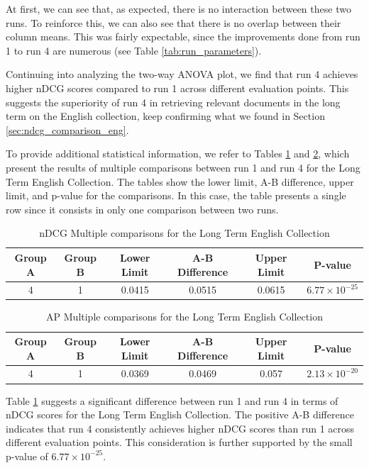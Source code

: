 At first, we can see that, as expected, there is no interaction between these two runs. To reinforce this, we can also see that there is no overlap between their column means.
This was fairly expectable, since the improvements done from run 1 to run 4 are numerous (see Table \ref{tab:run_parameters}).

Continuing into analyzing the two-way \ac{ANOVA} plot, we find that run 4 achieves higher \ac{nDCG} scores compared to run 1 across different evaluation points. 
This suggests the superiority of run 4 in retrieving relevant documents in the long term on the English collection, keep confirming what we found in Section \ref{sec:ndcg_comparison_eng}. 

To provide additional statistical information, we refer to Tables \ref{table:lt_anova_eng} and \ref{table:lt_anova_eng_ap}, which present the results of multiple comparisons between run 1 and run 4 for the Long Term English Collection. 
The tables show the lower limit, A-B difference, upper limit, and p-value for the comparisons. 
In this case, the table presents a single row since it consists in only one comparison between two runs.

\begin{table}[!h]
    \centering
    \caption{\ac{nDCG} Multiple comparisons for the Long Term English Collection}
    \label{table:lt_anova_eng}
    \begin{tabular}{cccccc}
    \hline
    Group A & Group B & Lower Limit & A-B Difference & Upper Limit & P-value \\
    \hline
    4 & 1 & 0.0415 & 0.0515 & 0.0615 & $6.77 \times 10^{-25}$ \\
    \hline
    \end{tabular}
\end{table}

\begin{table}[!h]
    \centering
    \caption{\ac{AP} Multiple comparisons for the Long Term English Collection}
    \label{table:lt_anova_eng_ap}
    \begin{tabular}{cccccc}
    \hline
    Group A & Group B & Lower Limit & A-B Difference & Upper Limit & P-value \\
    \hline
    4 & 1 & 0.0369 & 0.0469 & 0.057 & $2.13 \times 10^{-20}$ \\
    \hline
    \end{tabular}
\end{table}
    
Table \ref{table:lt_anova_eng} suggests a significant difference between run 1 and run 4 in terms of \ac{nDCG} scores for the Long Term English Collection. 
The positive A-B difference indicates that run 4 consistently achieves higher \ac{nDCG} scores than run 1 across different evaluation points. This consideration is further supported by the small p-value of $6.77 \times 10^{-25}$.

